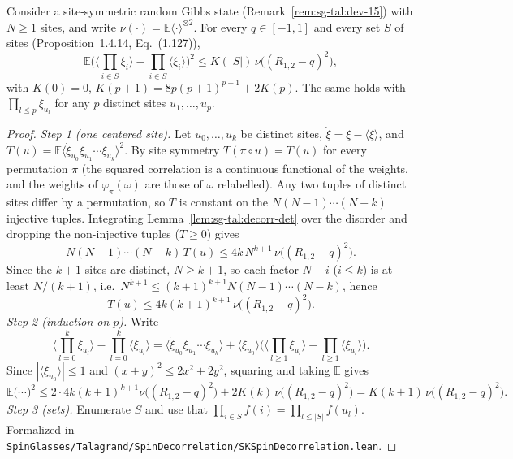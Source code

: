\begin{proposition}\label{prop:sg-tal:spin-decorr}
  \leanok
{}
Consider a site-symmetric random Gibbs state (Remark~\ref{rem:sg-tal:dev-15}) with $N\ge1$ sites, and write $\nu(\cdot)=\mathbb{E}\langle\cdot\rangle^{\otimes2}$. For every $q\in[-1,1]$ and every set $S$ of sites (Proposition~1.4.14, Eq.~(1.127)),
\[
\mathbb{E}\Big(\Big\langle\prod_{i\in S}\xi_i\Big\rangle-\prod_{i\in S}\langle\xi_i\rangle\Big)^2\le K(|S|)\,\nu\big((R_{1,2}-q)^2\big),
\]
with $K(0)=0$, $K(p+1)=8p(p+1)^{p+1}+2K(p)$. The same holds with $\prod_{l\le p}\xi_{u_l}$ for any $p$ distinct sites $u_1,\dots,u_p$.
\end{proposition}
\begin{proof}
\leanok
\emph{Step 1 (one centered site).} Let $u_0,\dots,u_k$ be distinct sites, $\dot\xi=\xi-\langle\xi\rangle$, and $T(u)=\mathbb{E}\langle\dot\xi_{u_0}\xi_{u_1}\cdots\xi_{u_k}\rangle^2$. By site symmetry $T(\pi\circ u)=T(u)$ for every permutation $\pi$ (the squared correlation is a continuous functional of the weights, and the weights of $\varphi_\pi(\omega)$ are those of $\omega$ relabelled). Any two tuples of distinct sites differ by a permutation, so $T$ is constant on the $N(N-1)\cdots(N-k)$ injective tuples. Integrating Lemma~\ref{lem:sg-tal:decorr-det} over the disorder and dropping the non-injective tuples ($T\ge0$) gives
\[
N(N-1)\cdots(N-k)\,T(u)\le4k\,N^{k+1}\,\nu\big((R_{1,2}-q)^2\big).
\]
Since the $k+1$ sites are distinct, $N\ge k+1$, so each factor $N-i$ ($i\le k$) is at least $N/(k+1)$, i.e.\ $N^{k+1}\le(k+1)^{k+1}N(N-1)\cdots(N-k)$, hence
\[
T(u)\le4k(k+1)^{k+1}\,\nu\big((R_{1,2}-q)^2\big).
\]
\emph{Step 2 (induction on $p$).} Write
\[
\Big\langle\prod_{l=0}^k\xi_{u_l}\Big\rangle-\prod_{l=0}^k\langle\xi_{u_l}\rangle=\big\langle\dot\xi_{u_0}\xi_{u_1}\cdots\xi_{u_k}\big\rangle+\langle\xi_{u_0}\rangle\Big(\Big\langle\prod_{l\ge1}\xi_{u_l}\Big\rangle-\prod_{l\ge1}\langle\xi_{u_l}\rangle\Big).
\]
Since $|\langle\xi_{u_0}\rangle|\le1$ and $(x+y)^2\le2x^2+2y^2$, squaring and taking $\mathbb E$ gives
\[
\mathbb E\Big(\cdots\Big)^2\le2\cdot4k(k+1)^{k+1}\nu\big((R_{1,2}-q)^2\big)+2K(k)\,\nu\big((R_{1,2}-q)^2\big)=K(k+1)\,\nu\big((R_{1,2}-q)^2\big).
\]
\emph{Step 3 (sets).} Enumerate $S$ and use that $\prod_{i\in S}f(i)=\prod_{l\le|S|}f(u_l)$.
Formalized in \texttt{SpinGlasses/Talagrand/SpinDecorrelation/SKSpinDecorrelation.lean}.
\end{proof}

